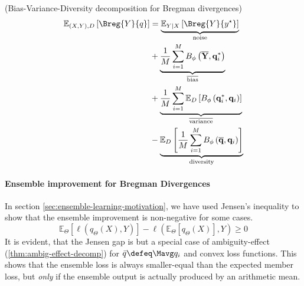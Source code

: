 \documentclass[../main.tex]{subfiles}
\begin{document}
\begin{theorem} (Bias-Variance-Diversity decomposition for Bregman divergences)
    \label{thm:bregman-diversity-decomp}
\begin{align*}
\mathbb{E}_{(X,Y), D}\left[ \Breg{Y}{q} \right]  
&= \underbrace{\mathbb{E}_{Y|X}\left[ \Breg{Y}{y^\star} \right]   }_{\text{noise}} \\
&+
\underbrace{
    \frac{1}{M} \sum_{i=1}^M B_\phi\left(\overline{\mathbf{Y}}, \mathbf{q}_i^*\right)
}_{\overline{\text{bias}}} \\
&+
\underbrace{
    \frac{1}{M} \sum_{i=1}^M \mathbb{E}_D\left[B_\phi\left(\mathbf{q}_i^*, \mathbf{q}_i\right)\right]
}_{\overline{\text{variance}}} \\
&-
\underbrace{
    \mathbb{E}_D\left[\frac{1}{M} \sum_{i=1}^M B_\phi\left(\overline{\mathbf{q}}, \mathbf{q}_i\right)\right]
}_{\text{diversity}}
\end{align*}
\end{theorem}




\paragraph{Ensemble improvement for Bregman Divergences}

In section \ref{sec:ensemble-learning-motivation}, we have used Jensen's inequality to show that the ensemble improvement is non-negative for some cases.
$$
\mathbb{E}_{{\Theta}}\left[ \ell (q_{\Theta}(X),Y) \right]  -
\ell(\mathbb{E}_{\Theta}\left[ q_{\Theta}(X) \right] ,Y ) \geq 0
$$
It is evident, that the Jensen gap is but a special case of ambiguity-effect (\ref{thm:ambig-effect-decomp}) for $\bar{q} \defeq \Mavg q_{i}$ and convex loss functions. 
This shows that the ensemble loss is always smaller-equal than the expected member loss, but \textit{only} if the ensemble output is actually produced by an arithmetic mean. 
\end{document}

